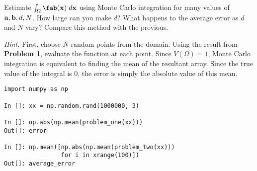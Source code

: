 \break
\begin{problem}
\label{prob:mc}
Estimate $\int_{\Omega} \fab({\bf x}) \;d{\bf x}$ using Monte Carlo integration
for many values of ${\bf a}, {\bf b}, d, N$. How large can you make $d$? What
happens to the average error as $d$ and $N$ vary? Compare this method with the
previous.

\nopagebreak[2]

\vspace{5mm}
\noindent
{\it Hint.} First, choose $N$ random points from the domain. Using the result
from {\bf Problem 1}, evaluate the function at each point. Since $V(\Omega) =
1$, Monte Carlo integration is equivalent to finding the mean of the resultant
array. Since the true value of the integral is $0$, the error is simply the
absolute value of this mean.

\nopagebreak[2]

\begin{verbatim}
import numpy as np

In []: xx = np.random.rand(1000000, 3)

In []: np.abs(np.mean(problem_one(xx)))
Out[]: error

In []: np.mean([np.abs(np.mean(problem_two(xx)))
                for i in xrange(100)])
Out[]: average_error
\end{verbatim}
\end{problem}

\let\fab\undefined
